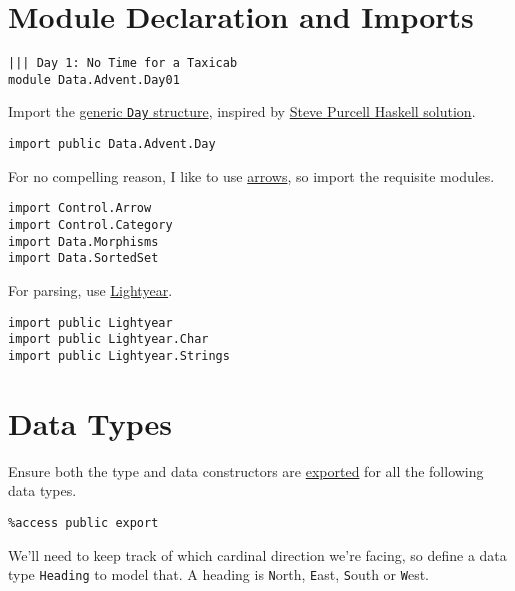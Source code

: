 \documentclass[b5paper,twoside]{amsbook}
\begin{document}
\newpage

\section{Module Declaration and
Imports}\label{module-declaration-and-imports}

\begin{verbatim}
||| Day 1: No Time for a Taxicab
module Data.Advent.Day01
\end{verbatim}

Import the
\href{https://github.com/yurrriq/advent-of-idris/blob/master/src/Data/Advent/Day.idr}{generic
\texttt{Day} structure}, inspired by
\href{https://github.com/purcell/adventofcode2016}{Steve Purcell Haskell
solution}.

\begin{verbatim}
import public Data.Advent.Day
\end{verbatim}

For no compelling reason, I like to use
\href{https://www.haskell.org/arrows/}{arrows}, so import the requisite
modules.

\begin{verbatim}
import Control.Arrow
import Control.Category
import Data.Morphisms
import Data.SortedSet
\end{verbatim}

For parsing, use \href{https://github.com/ziman/lightyear}{Lightyear}.

\begin{verbatim}
import public Lightyear
import public Lightyear.Char
import public Lightyear.Strings
\end{verbatim}

\section{Data Types}\label{data-types}

Ensure both the type and data constructors are
\href{http://docs.idris-lang.org/en/latest/tutorial/modules.html\#meaning-for-data-types}{exported}
for all the following data types.

\begin{verbatim}
%access public export
\end{verbatim}

We'll need to keep track of which cardinal direction we're facing, so
define a data type \texttt{Heading} to model that. A
heading is \texttt{N}orth, \texttt{E}ast,
\texttt{S}outh or \texttt{W}est.
\end{document}
